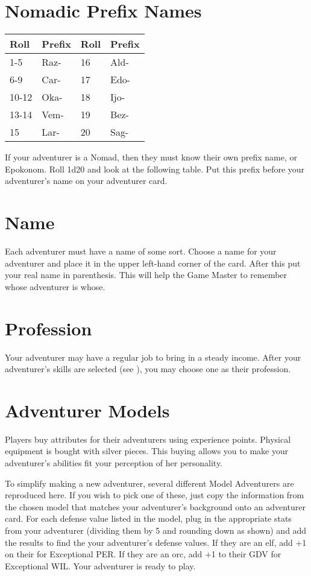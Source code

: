 \section{Nomadic Prefix Names}


\begin{normbox}
\small
\begin{tabular}{l l|l l}
Roll & Prefix & Roll & Prefix\\
\midrule
1-5 & Raz- & 16 & Ald-\\
6-9 & Car- & 17 & Edo-\\
10-12 & Oka- & 18 & Ijo-\\
13-14 & Vem- & 19 & Bez-\\
15 & Lar- & 20 & Sag-\\
\end{tabular}
\normalsize
\end{normbox}

If your adventurer is a Nomad, then they must know their own prefix name, or Epokonom. Roll 1d20 and look at the following table. Put this prefix before your adventurer's name on your adventurer card.

\section{Name}
Each adventurer must have a name of some sort. Choose a name for your adventurer and place it in the upper left-hand corner of the card. After this put your real name in parenthesis. This will help the Game Master to remember whose adventurer is whose.
\section{Profession}
Your adventurer may have a regular job to bring in a steady income. After your adventurer's skills are selected (see ), you may choose one as their profession.
\pagebreak
\section{Adventurer Models}
Players buy attributes for their adventurers using experience points. Physical equipment is bought with silver pieces. This buying allows you to make your adventurer's abilities fit your perception of her personality.

To simplify making a new adventurer, several different Model Adventurers are reproduced here. If you wish to pick one of these, just copy the information from the chosen model that matches your adventurer's background onto an adventurer card. For each defense value listed in the model, plug in the appropriate stats from your adventurer (dividing them by 5 and rounding down as shown) and add the results to find the your adventurer's defense values. If they are an elf, add +1 on their \DV for Exceptional PER. If they are an orc, add +1 to their GDV for Exceptional WIL. Your adventurer is ready to play.

